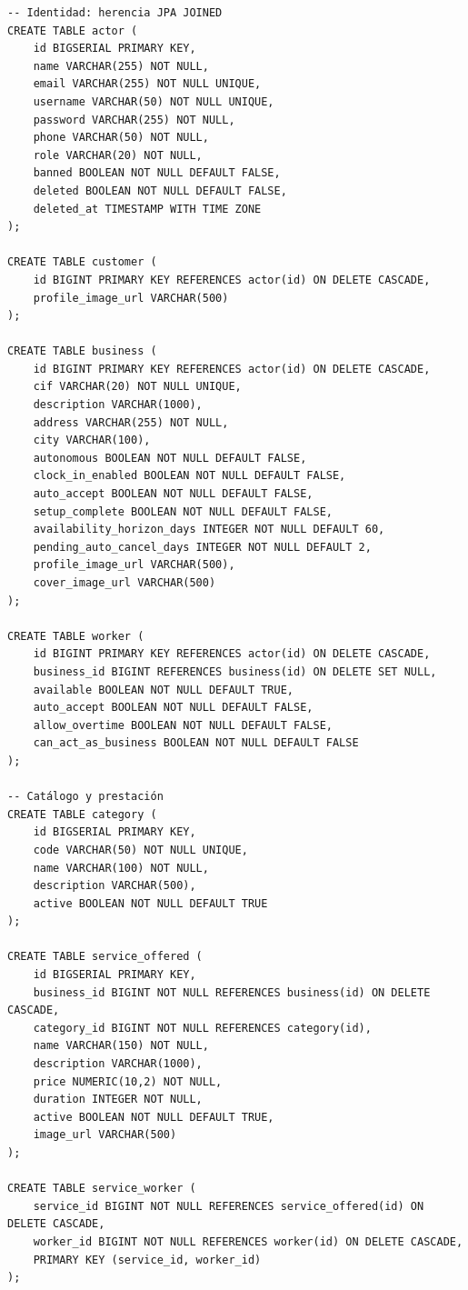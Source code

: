 \documentclass[12pt,a4paper,twoside]{report}
\begin{document}
\begin{lstlisting}[style=sqlStyle, caption={DDL resumido de las migraciones principales (V1--V5)}, label={lst:ddl}]
-- Identidad: herencia JPA JOINED
CREATE TABLE actor (
    id BIGSERIAL PRIMARY KEY,
    name VARCHAR(255) NOT NULL,
    email VARCHAR(255) NOT NULL UNIQUE,
    username VARCHAR(50) NOT NULL UNIQUE,
    password VARCHAR(255) NOT NULL,
    phone VARCHAR(50) NOT NULL,
    role VARCHAR(20) NOT NULL,
    banned BOOLEAN NOT NULL DEFAULT FALSE,
    deleted BOOLEAN NOT NULL DEFAULT FALSE,
    deleted_at TIMESTAMP WITH TIME ZONE
);

CREATE TABLE customer (
    id BIGINT PRIMARY KEY REFERENCES actor(id) ON DELETE CASCADE,
    profile_image_url VARCHAR(500)
);

CREATE TABLE business (
    id BIGINT PRIMARY KEY REFERENCES actor(id) ON DELETE CASCADE,
    cif VARCHAR(20) NOT NULL UNIQUE,
    description VARCHAR(1000),
    address VARCHAR(255) NOT NULL,
    city VARCHAR(100),
    autonomous BOOLEAN NOT NULL DEFAULT FALSE,
    clock_in_enabled BOOLEAN NOT NULL DEFAULT FALSE,
    auto_accept BOOLEAN NOT NULL DEFAULT FALSE,
    setup_complete BOOLEAN NOT NULL DEFAULT FALSE,
    availability_horizon_days INTEGER NOT NULL DEFAULT 60,
    pending_auto_cancel_days INTEGER NOT NULL DEFAULT 2,
    profile_image_url VARCHAR(500),
    cover_image_url VARCHAR(500)
);

CREATE TABLE worker (
    id BIGINT PRIMARY KEY REFERENCES actor(id) ON DELETE CASCADE,
    business_id BIGINT REFERENCES business(id) ON DELETE SET NULL,
    available BOOLEAN NOT NULL DEFAULT TRUE,
    auto_accept BOOLEAN NOT NULL DEFAULT FALSE,
    allow_overtime BOOLEAN NOT NULL DEFAULT FALSE,
    can_act_as_business BOOLEAN NOT NULL DEFAULT FALSE
);

-- Catálogo y prestación
CREATE TABLE category (
    id BIGSERIAL PRIMARY KEY,
    code VARCHAR(50) NOT NULL UNIQUE,
    name VARCHAR(100) NOT NULL,
    description VARCHAR(500),
    active BOOLEAN NOT NULL DEFAULT TRUE
);

CREATE TABLE service_offered (
    id BIGSERIAL PRIMARY KEY,
    business_id BIGINT NOT NULL REFERENCES business(id) ON DELETE CASCADE,
    category_id BIGINT NOT NULL REFERENCES category(id),
    name VARCHAR(150) NOT NULL,
    description VARCHAR(1000),
    price NUMERIC(10,2) NOT NULL,
    duration INTEGER NOT NULL,
    active BOOLEAN NOT NULL DEFAULT TRUE,
    image_url VARCHAR(500)
);

CREATE TABLE service_worker (
    service_id BIGINT NOT NULL REFERENCES service_offered(id) ON DELETE CASCADE,
    worker_id BIGINT NOT NULL REFERENCES worker(id) ON DELETE CASCADE,
    PRIMARY KEY (service_id, worker_id)
);


\end{lstlisting}
\end{document}
